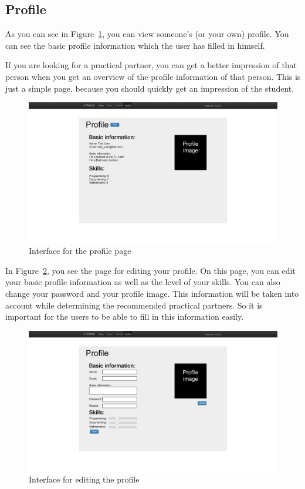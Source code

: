 \subsection{Profile}
As you can see in Figure~\ref{mockup_profile}, you can view someone's (or your own) profile.
You can see the basic profile information which the user has filled in himself.

If you are looking for a practical partner, you can get a better impression of that person when you get an overview of the profile information of that person.
This is just a simple page, because you should quickly get an impression of the student.\\

\begin{figure}[H]
    \centering
    \captionsetup{justification=centering}
    \includegraphics[width=\textwidth, frame]{images/mockup_profile}
    \caption{Interface for the profile page}
    \label{mockup_profile}
\end{figure}

In Figure~\ref{mockup_edit_profile}, you see the page for editing your profile.
On this page, you can edit your basic profile information as well as the level of your skills.
You can also change your password and your profile image.
This information will be taken into account while determining the recommended practical partners.
So it is important for the users to be able to fill in this information easily.

\begin{figure}[H]
    \centering
    \captionsetup{justification=centering}
    \includegraphics[width=\textwidth, frame]{images/mockup_edit_profile}
    \caption{Interface for editing the profile}
    \label{mockup_edit_profile}
\end{figure}

